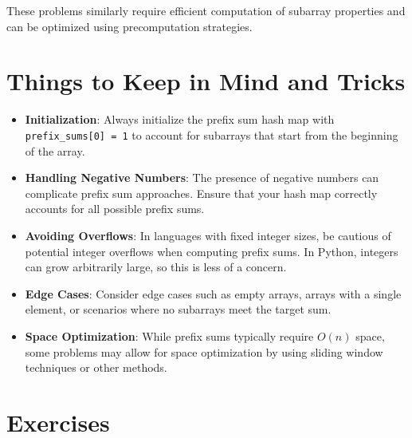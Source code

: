 These problems similarly require efficient computation of subarray properties and can be optimized using precomputation strategies.

\section*{Things to Keep in Mind and Tricks}

\begin{itemize}
    \item \textbf{Initialization}: Always initialize the prefix sum hash map with \texttt{prefix\_sums[0] = 1} to account for subarrays that start from the beginning of the array.
    
    \item \textbf{Handling Negative Numbers}: The presence of negative numbers can complicate prefix sum approaches. Ensure that your hash map correctly accounts for all possible prefix sums.
    
    \item \textbf{Avoiding Overflows}: In languages with fixed integer sizes, be cautious of potential integer overflows when computing prefix sums. In Python, integers can grow arbitrarily large, so this is less of a concern.
    
    \item \textbf{Edge Cases}: Consider edge cases such as empty arrays, arrays with a single element, or scenarios where no subarrays meet the target sum.
    
    \item \textbf{Space Optimization}: While prefix sums typically require \(O(n)\) space, some problems may allow for space optimization by using sliding window techniques or other methods.
\end{itemize}

\section*{Exercises}

